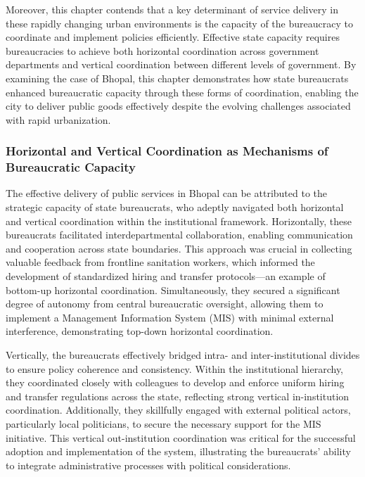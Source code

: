 Moreover, this chapter contends that a key determinant of service delivery in these rapidly changing urban environments is the capacity of the bureaucracy to coordinate and implement policies efficiently. Effective state capacity requires bureaucracies to achieve both horizontal coordination across government departments and vertical coordination between different levels of government. By examining the case of Bhopal, this chapter demonstrates how state bureaucrats enhanced bureaucratic capacity through these forms of coordination, enabling the city to deliver public goods effectively despite the evolving challenges associated with rapid urbanization.

\subsubsection{Horizontal and Vertical Coordination as Mechanisms of Bureaucratic Capacity}

The effective delivery of public services in Bhopal can be attributed to the strategic capacity of state bureaucrats, who adeptly navigated both horizontal and vertical coordination within the institutional framework. Horizontally, these bureaucrats facilitated interdepartmental collaboration, enabling communication and cooperation across state boundaries. This approach was crucial in collecting valuable feedback from frontline sanitation workers, which informed the development of standardized hiring and transfer protocols—an example of bottom-up horizontal coordination. Simultaneously, they secured a significant degree of autonomy from central bureaucratic oversight, allowing them to implement a Management Information System (MIS) with minimal external interference, demonstrating top-down horizontal coordination.

Vertically, the bureaucrats effectively bridged intra- and inter-institutional divides to ensure policy coherence and consistency. Within the institutional hierarchy, they coordinated closely with colleagues to develop and enforce uniform hiring and transfer regulations across the state, reflecting strong vertical in-institution coordination. Additionally, they skillfully engaged with external political actors, particularly local politicians, to secure the necessary support for the MIS initiative. This vertical out-institution coordination was critical for the successful adoption and implementation of the system, illustrating the bureaucrats' ability to integrate administrative processes with political considerations.

